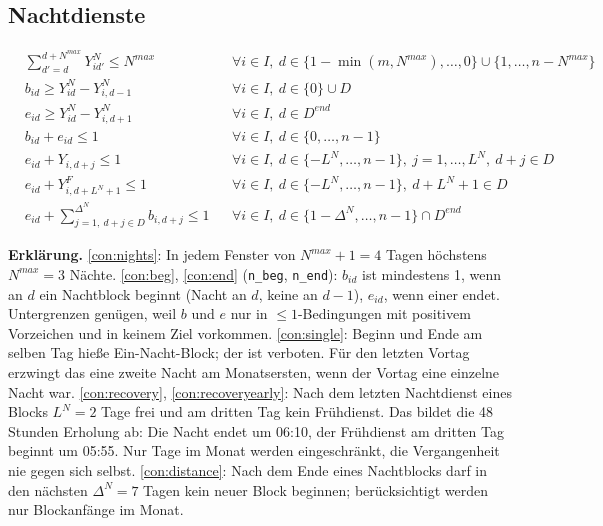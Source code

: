 \documentclass[11pt]{combiArticle}
\newcommand{\code}[1]{\texttt{#1}}
\begin{document}
\subsection{Nachtdienste}

\begin{align}
  & \textstyle\sum_{d' = d}^{d + N^{max}} Y^{N}_{id'} \le N^{max}
    && \forall i \in I,\ d \in \{1-\min(m,N^{max}),\dots,0\} \cup \{1,\dots,n-N^{max}\} \label{con:nights}\\
  & b_{id} \ge Y^{N}_{id} - Y^{N}_{i,d-1} && \forall i \in I,\ d \in \{0\} \cup D \label{con:beg}\\
  & e_{id} \ge Y^{N}_{id} - Y^{N}_{i,d+1} && \forall i \in I,\ d \in D^{end} \label{con:end}\\
  & b_{id} + e_{id} \le 1 && \forall i \in I,\ d \in \{0,\dots,n-1\} \label{con:single}\\
  & e_{id} + Y_{i,d+j} \le 1 && \forall i \in I,\ d \in \{-L^{N},\dots,n-1\},\ j = 1,\dots,L^{N},\ d+j \in D \label{con:recovery}\\
  & e_{id} + Y^{F}_{i,d+L^{N}+1} \le 1 && \forall i \in I,\ d \in \{-L^{N},\dots,n-1\},\ d+L^{N}+1 \in D \label{con:recoveryearly}\\
  & e_{id} + \textstyle\sum_{j = 1,\ d+j \in D}^{\Delta^{N}} b_{i,d+j} \le 1 && \forall i \in I,\ d \in \{1-\Delta^{N},\dots,n-1\} \cap D^{end} \label{con:distance}
\end{align}

\textbf{Erklärung.}
\eqref{con:nights}: In jedem Fenster von $N^{max}+1 = 4$ Tagen höchstens $N^{max} = 3$ Nächte.
\eqref{con:beg}, \eqref{con:end} (\code{n\_beg}, \code{n\_end}): $b_{id}$ ist mindestens 1, wenn an $d$ ein
Nachtblock beginnt (Nacht an $d$, keine an $d-1$), $e_{id}$, wenn einer endet. Untergrenzen genügen, weil $b$
und $e$ nur in $\le 1$-Bedingungen mit positivem Vorzeichen und in keinem Ziel vorkommen.
\eqref{con:single}: Beginn und Ende am selben Tag hieße Ein-Nacht-Block; der ist verboten. Für den letzten
Vortag erzwingt das eine zweite Nacht am Monatsersten, wenn der Vortag eine einzelne Nacht war.
\eqref{con:recovery}, \eqref{con:recoveryearly}: Nach dem letzten Nachtdienst eines Blocks $L^{N} = 2$ Tage
frei und am dritten Tag kein Frühdienst. Das bildet die 48 Stunden Erholung ab: Die Nacht endet um 06:10, der
Frühdienst am dritten Tag beginnt um 05:55. Nur Tage im Monat werden eingeschränkt, die Vergangenheit nie
gegen sich selbst.
\eqref{con:distance}: Nach dem Ende eines Nachtblocks darf in den nächsten $\Delta^{N} = 7$ Tagen kein neuer
Block beginnen; berücksichtigt werden nur Blockanfänge im Monat.
\end{document}
